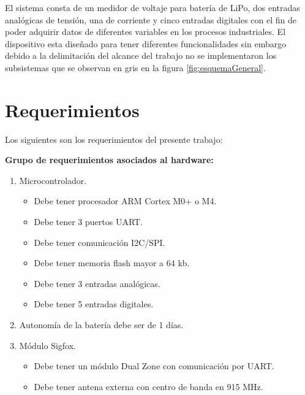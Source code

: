 El sistema consta de un medidor de voltaje para batería de LiPo, dos entradas analógicas de tensión, una de corriente y cinco entradas digitales con el fin de poder adquirir datos de diferentes variables en los procesos industriales. El dispositivo esta diseñado para tener diferentes funcionalidades sin embargo debido a la delimitación del alcance del trabajo no se implementaron los subsistemas que se observan en gris en la figura \ref{fig:esquemaGeneral}.


\section{Requerimientos}
Los siguientes son los requerimientos del presente trabajo:

\textbf{Grupo de requerimientos asociados al hardware:}
\begin{enumerate}

	\item Microcontrolador.

	\begin{itemize}

		\item Debe tener procesador ARM Cortex M0+ o M4.

		\item Debe tener 3 puertos UART.

		\item Debe tener comunicación I2C/SPI.

		\item Debe tener memoria flash mayor a 64 kb.

		\item Debe tener 3 entradas analógicas.

		\item Debe tener 5 entradas digitales.

	\end{itemize}


	\item Autonomía de la batería debe ser de 1 días.

	\item Módulo Sigfox.

		\begin{itemize}

			\item Debe tener un módulo Dual Zone con comunicación por UART.

			\item Debe tener antena externa con centro de banda en 915 MHz.


\end{itemize}
\end{enumerate}
